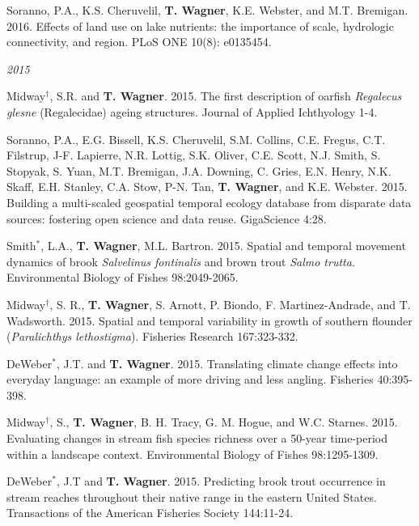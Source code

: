 \documentclass[10pt]{article}
\begin{document}
\begin{flushleft}
\begin{etaremune}[start=55]
\item Soranno, P.A., K.S. Cheruvelil, {\bf T. Wagner}, K.E. Webster, and M.T. Bremigan. 2016. Effects of land use on lake nutrients: the importance of scale, hydrologic connectivity, and region. PLoS ONE  10(8): e0135454.

\end{etaremune}
\emph{2015}
\begin{etaremune}[start=48]
\item Midway$^\dagger$, S.R. and {\bf T. Wagner}. 2015. The first description of oarfish \emph{Regalecus glesne} (Regalecidae) ageing structures. Journal of Applied Ichthyology 1-4.

\item Soranno, P.A., E.G. Bissell, K.S. Cheruvelil, S.M. Collins, C.E. Fregus, C.T. Filstrup, J-F. Lapierre, N.R. Lottig, S.K. Oliver, C.E. Scott, N.J. Smith, S. Stopyak, S. Yuan, M.T. Bremigan, J.A. Downing, C. Gries, E.N. Henry, N.K. Skaff, E.H. Stanley, C.A. Stow, P-N. Tan, {\bf T. Wagner}, and K.E. Webster. 2015. Building a multi-scaled geospatial temporal ecology database from disparate data sources: fostering open science and data reuse. GigaScience 4:28.

\item Smith$^*$, L.A., {\bf T. Wagner}, M.L. Bartron. 2015. Spatial and temporal movement dynamics of brook \emph{Salvelinus fontinalis} and brown trout \emph{Salmo trutta}. Environmental Biology of Fishes 98:2049-2065.

\item Midway$^\dagger$, S. R., {\bf T. Wagner}, S. Arnott, P. Biondo, F. Martinez-Andrade, and T. Wadsworth. 2015. Spatial and temporal variability in growth of southern flounder (\emph{Paralichthys lethostigma}). Fisheries Research 167:323-332.

\item DeWeber$^*$, J.T. and {\bf T. Wagner}. 2015. Translating climate change effects into everyday language: an example of more driving and less angling. Fisheries 40:395-398.

\item Midway$^\dagger$, S., {\bf T. Wagner}, B. H. Tracy, G. M. Hogue, and W.C. Starnes. 2015. Evaluating changes in stream fish species richness over a 50-year time-period within a landscape context. Environmental Biology of Fishes 98:1295-1309.

\item DeWeber$^*$, J.T and {\bf T. Wagner}. 2015. Predicting brook trout occurrence in stream reaches throughout their native range in the eastern United States. Transactions of the American Fisheries Society 144:11-24. 


\end{etaremune}
\end{flushleft}
\end{document}
